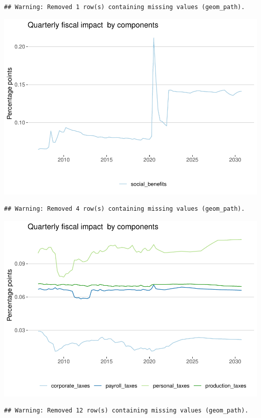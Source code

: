 \documentclass[
]{article}
\begin{document}
\begin{verbatim}
## Warning: Removed 1 row(s) containing missing values (geom_path).
\end{verbatim}

\begin{center}\includegraphics{projections_files/figure-latex/social benefits-1} \end{center}

\begin{verbatim}
## Warning: Removed 4 row(s) containing missing values (geom_path).
\end{verbatim}

\begin{center}\includegraphics{projections_files/figure-latex/tax-1} \end{center}

\begin{verbatim}
## Warning: Removed 12 row(s) containing missing values (geom_path).
\end{verbatim}
\end{document}
